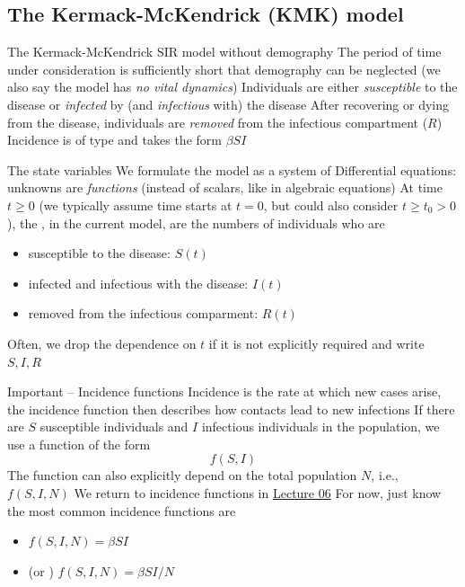 \documentclass[aspectratio=169]{beamer}\usepackage[]{graphicx}\usepackage[]{xcolor}
\begin{document}
\subsection{The Kermack-McKendrick (KMK) model}



\begin{frame}{The Kermack-McKendrick SIR model without demography}
\bbullet The period of time under consideration is sufficiently short that demography can be neglected (we also say the model has \emph{no vital dynamics})
\vfill
\bbullet Individuals are either \emph{susceptible} to the disease or \emph{infected} by (and \emph{infectious} with) the disease
\vfill
\bbullet After recovering or dying from the disease, individuals are \emph{removed} from the infectious compartment ($R$)
\vfill
\bbullet Incidence is of  type and takes the form $\beta SI$
\end{frame}


\begin{frame}{The state variables}
We formulate the model as a system of 
\vfill
Differential equations: unknowns are \emph{functions} (instead of scalars, like in algebraic equations)
\vfill
At time $t\geq 0$ (we typically assume time starts at $t=0$, but could also consider $t\geq t_0>0$), the , in the current model, are the numbers of individuals who are
\begin{itemize}
\item susceptible to the disease: $S(t)$
\item infected and infectious with the disease: $I(t)$
\item removed from the infectious comparment: $R(t)$
\end{itemize}
\vfill
Often, we drop the dependence on $t$ if it is not explicitly required and write $S,I,R$
\end{frame}



\begin{frame}{Important -- Incidence functions}
Incidence is the rate at which new cases arise, the incidence function then describes how contacts lead to new infections
\vfill
If there are $S$ susceptible individuals and $I$ infectious individuals in the population, we use a function of the form
\[
f(S,I)
\]
The function can also explicitly depend on the total population $N$, i.e., $f(S,I,N)$
\vfill
We return to incidence functions in \href{no.se}{Lecture 06}
\vfill
For now, just know the most common incidence functions are
\begin{itemize}
\item {} $f(S,I,N)=\beta SI$
\item {} (or )  $f(S,I,N)=\beta SI/N$
\end{itemize}
\end{frame}
\end{document}

